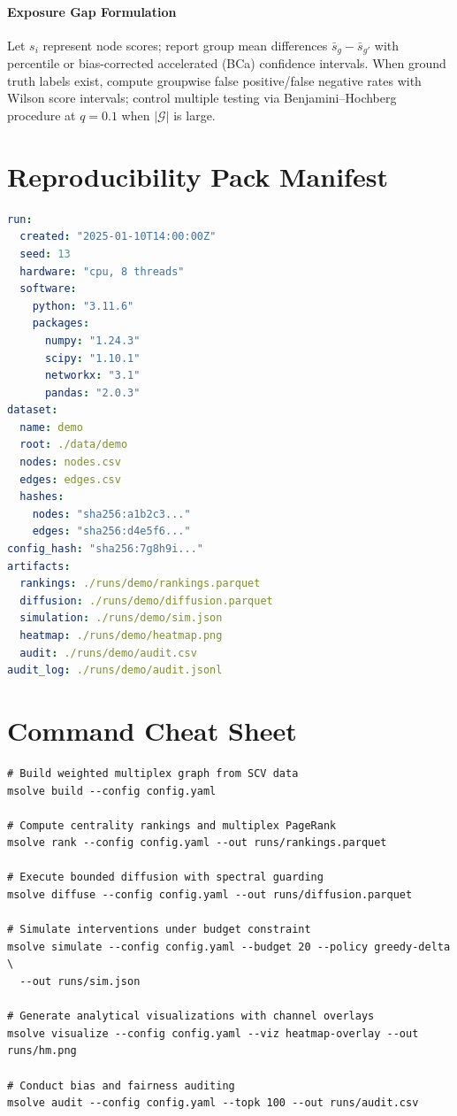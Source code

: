 \documentclass[12pt]{article}
\theoremstyle{plain}
\begin{document}
\paragraph{Exposure Gap Formulation}
Let $s_i$ represent node scores; report group mean differences $\bar{s}_g-\bar{s}_{g'}$ with percentile or bias-corrected accelerated (BCa) confidence intervals. When ground truth labels exist, compute groupwise false positive/false negative rates with Wilson score intervals; control multiple testing via Benjamini–Hochberg procedure at $q=0.1$ when $|\mathcal{G}|$ is large.

\section{Reproducibility Pack Manifest}
\label{app:manifest}
\begin{lstlisting}[language=yaml,caption={Complete Reproducibility Manifest (YAML)}]
run:
  created: "2025-01-10T14:00:00Z"
  seed: 13
  hardware: "cpu, 8 threads"
  software:
    python: "3.11.6"
    packages:
      numpy: "1.24.3"
      scipy: "1.10.1"
      networkx: "3.1"
      pandas: "2.0.3"
dataset:
  name: demo
  root: ./data/demo
  nodes: nodes.csv
  edges: edges.csv
  hashes:
    nodes: "sha256:a1b2c3..."
    edges: "sha256:d4e5f6..."
config_hash: "sha256:7g8h9i..."
artifacts:
  rankings: ./runs/demo/rankings.parquet
  diffusion: ./runs/demo/diffusion.parquet
  simulation: ./runs/demo/sim.json
  heatmap: ./runs/demo/heatmap.png
  audit: ./runs/demo/audit.csv
audit_log: ./runs/demo/audit.jsonl
\end{lstlisting}

\section{Command Cheat Sheet}
\label{app:cheatsheet}
\begin{verbatim}
# Build weighted multiplex graph from SCV data
msolve build --config config.yaml

# Compute centrality rankings and multiplex PageRank
msolve rank --config config.yaml --out runs/rankings.parquet

# Execute bounded diffusion with spectral guarding
msolve diffuse --config config.yaml --out runs/diffusion.parquet

# Simulate interventions under budget constraint
msolve simulate --config config.yaml --budget 20 --policy greedy-delta \
  --out runs/sim.json

# Generate analytical visualizations with channel overlays
msolve visualize --config config.yaml --viz heatmap-overlay --out runs/hm.png

# Conduct bias and fairness auditing
msolve audit --config config.yaml --topk 100 --out runs/audit.csv
\end{verbatim}
\end{document}
